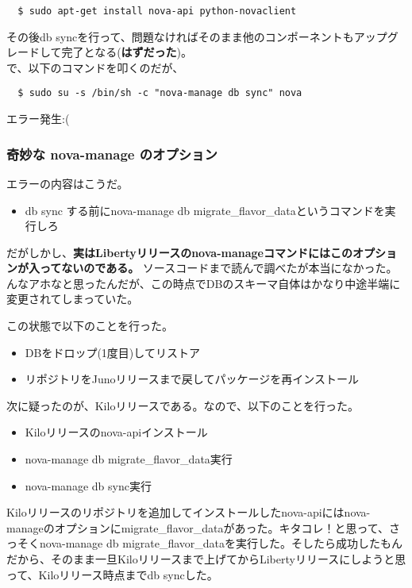 \documentclass[9pt,b5paper,tombo,openany]{jsbook}
\begin{document}
\begin{lstlisting}
  $ sudo apt-get install nova-api python-novaclient
\end{lstlisting}

その後db syncを行って、問題なければそのまま他のコンポーネントもアップグレードして完了となる(\textbf{はずだった})。\\[1ex]

\noindent
で、以下のコマンドを叩くのだが、

\begin{lstlisting}
  $ sudo su -s /bin/sh -c "nova-manage db sync" nova
\end{lstlisting}

\noindent
エラー発生:(

\subsubsection{奇妙な nova-manage のオプション}
\noindent
エラーの内容はこうだ。

\begin{itemize}
	\item db sync する前にnova-manage db migrate\_flavor\_dataというコマンドを実行しろ
\end{itemize}

だがしかし、\textbf{実はLibertyリリースのnova-manageコマンドにはこのオプションが入ってないのである。} ソースコードまで読んで調べたが本当になかった。んなアホなと思ったんだが、この時点でDBのスキーマ自体はかなり中途半端に変更されてしまっていた。

\noindent
この状態で以下のことを行った。

\begin{itemize}
	\item DBをドロップ(1度目)してリストア
	\item リポジトリをJunoリリースまで戻してパッケージを再インストール
\end{itemize}

\noindent
次に疑ったのが、Kiloリリースである。なので、以下のことを行った。

\begin{itemize}
	\item Kiloリリースのnova-apiインストール
	\item nova-manage db migrate\_flavor\_data実行
	\item nova-manage db sync実行
\end{itemize}

Kiloリリースのリポジトリを追加してインストールしたnova-apiにはnova-manageのオプションにmigrate\_flavor\_dataがあった。キタコレ！と思って、さっそくnova-manage db migrate\_flavor\_dataを実行した。そしたら成功したもんだから、そのまま一旦Kiloリリースまで上げてからLibertyリリースにしようと思って、Kiloリリース時点までdb syncした。\\[1ex]
\end{document}
